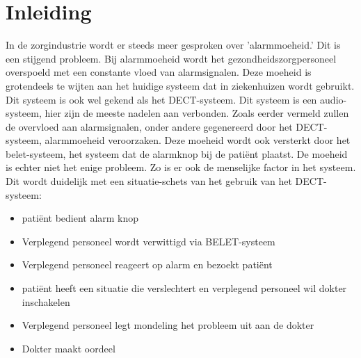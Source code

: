 


% 

\section{Inleiding}%
\label{sec:inleiding}

In de zorgindustrie wordt er steeds meer gesproken over 'alarmmoeheid.' Dit is een stijgend probleem. Bij alarmmoeheid wordt het gezondheidszorgpersoneel overspoeld met een constante vloed van alarmsignalen. Deze moeheid is grotendeels te wijten aan het huidige systeem dat in ziekenhuizen wordt gebruikt. Dit systeem is ook wel gekend als het DECT-systeem. Dit systeem is een audio-systeem, hier zijn de meeste nadelen aan verbonden. Zoals eerder vermeld zullen de overvloed aan alarmsignalen, onder andere gegenereerd door het DECT-systeem, alarmmoeheid veroorzaken. Deze moeheid wordt ook versterkt door het belet-systeem, het systeem dat de alarmknop bij de patiënt plaatst. De moeheid is echter niet het enige probleem. Zo is er ook de menselijke factor in het systeem. Dit wordt duidelijk met een situatie-schets van het gebruik van het DECT-systeem:

\begin{itemize}
  \item patiënt bedient alarm knop
  \item Verplegend personeel wordt verwittigd via BELET-systeem
  \item Verplegend personeel reageert op alarm en bezoekt patiënt
  \item patiënt heeft een situatie die verslechtert en verplegend personeel wil dokter inschakelen
  \item Verplegend personeel legt mondeling het probleem uit aan de dokter
  \item Dokter maakt oordeel
\end{itemize}

